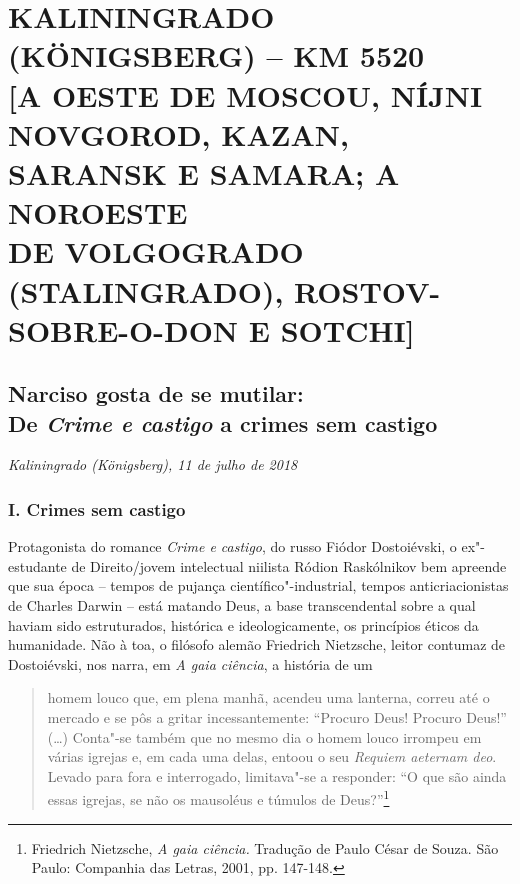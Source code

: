 
\movetooddpage
{}
\part*{KALININGRADO (KÖNIGSBERG) -- KM 5520\\{[}A OESTE DE MOSCOU, NÍJNI NOVGOROD, KAZAN, SARANSK E SAMARA; A NOROESTE\\DE VOLGOGRADO (STALINGRADO), ROSTOV-SOBRE-O-DON E SOTCHI{]}}


\chapter*{Narciso gosta de se mutilar:\\De \emph{Crime e castigo} a crimes sem castigo}

\begin{flushright}
\emph{Kaliningrado (Königsberg), 11 de julho de 2018}
\end{flushright}

\section{I. Crimes sem castigo}

Protagonista do romance \emph{Crime e castigo}, do russo Fiódor
Dostoiévski, o ex"-estudante de Direito/jovem intelectual niilista Ródion
Raskólnikov bem apreende que sua época -- tempos de pujança
científico"-industrial, tempos anticriacionistas de Charles Darwin --
está matando Deus, a base transcendental sobre a qual haviam sido
estruturados, histórica e ideologicamente, os princípios éticos da
humanidade. Não à toa, o filósofo alemão Friedrich Nietzsche, leitor
contumaz de Dostoiévski, nos narra, em \emph{A gaia ciência}, a história
de um

\begin{quote}
homem louco que, em plena manhã, acendeu uma lanterna, correu até o
mercado e se pôs a gritar incessantemente: ``Procuro Deus! Procuro
Deus!'' (\ldots{}) Conta"-se também que no mesmo dia o homem louco irrompeu em
várias igrejas e, em cada uma delas, entoou o seu \emph{Requiem aeternam
deo}. Levado para fora e interrogado, limitava"-se a responder: ``O que
são ainda essas igrejas, se não os mausoléus e túmulos de
Deus?''\footnote{Friedrich Nietzsche, \emph{A gaia ciência.} Tradução de
  Paulo César de Souza. São Paulo: Companhia das Letras, 2001, pp.
  147-148.}
\end{quote}

